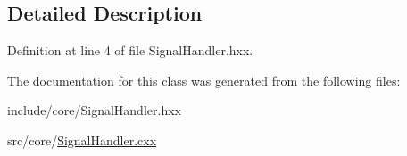 \subsection{Detailed Description}


Definition at line 4 of file Signal\+Handler.\+hxx.



The documentation for this class was generated from the following files\+:\begin{DoxyCompactItemize}
\item 
include/core/Signal\+Handler.\+hxx\item 
src/core/\mbox{\hyperlink{_signal_handler_8cxx}{Signal\+Handler.\+cxx}}\end{DoxyCompactItemize}
